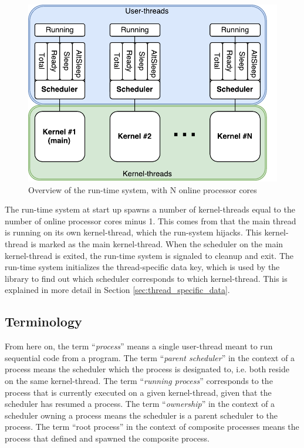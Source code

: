 \begin{figure}[h]
    \centering
    \includegraphics[width=0.6\linewidth]{fig/run-time_system}
    \caption{Overview of the run-time system, with N online processor cores}
    \label{fig:run-time_system}
\end{figure}

The run\hyp{}time system at start up spawns a number of kernel\hyp{}threads equal to the number of online processor cores minus 1. This comes from that the main thread is running on its own kernel\hyp{}thread, which the run\hyp{}system hijacks. This kernel\hyp{}thread is marked as the main kernel\hyp{}thread. When the scheduler on the main kernel\hyp{}thread is exited, the run\hyp{}time system is signaled to cleanup and exit. The run\hyp{}time system initializes the thread\hyp{}specific data key, which is used by the library to find out which scheduler corresponds to which kernel\hyp{}thread. This is explained in more detail in Section \ref{sec:thread_specific_data}.

\subsection*{Terminology}

From here on, the term ``\textit{process}'' means a single user\hyp{}thread meant to run sequential code from a program. The term ``\textit{parent scheduler}'' in the context of a process means the scheduler which the process is designated to, i.e. both reside on the same kernel\hyp{}thread. The term ``\textit{running process}'' corresponds to the process that is currently executed on a given kernel\hyp{}thread, given that the scheduler has resumed a process. The term ``\textit{ownership}'' in the context of a scheduler owning a process means the scheduler is a parent scheduler to the process. The term ``root process'' in the context of composite processes means the process that defined and spawned the composite process.

